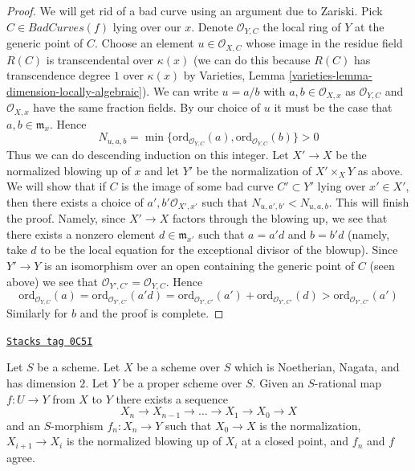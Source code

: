 \begin{proof}
\medskip\noindent
We will get rid of a bad curve using an argument due to Zariski.
Pick $C \in BadCurves(f)$ lying over our $x$. Denote $\mathcal{O}_{Y, C}$
the local ring of $Y$ at the generic point of $C$. Choose an element
$u \in \mathcal{O}_{X, C}$ whose image in the residue field
$R(C)$ is transcendental over $\kappa(x)$ (we can do this because
$R(C)$ has transcendence degree $1$ over $\kappa(x)$ by
Varieties, Lemma \ref{varieties-lemma-dimension-locally-algebraic}).
We can write $u = a/b$ with $a, b \in \mathcal{O}_{X, x}$ as
$\mathcal{O}_{Y, C}$ and $\mathcal{O}_{X, x}$ have the same
fraction fields. By our choice of $u$ it must be the case that
$a, b \in \mathfrak m_x$. Hence
$$
N_{u, a, b} = \min
\{\text{ord}_{\mathcal{O}_{Y, C}}(a), \text{ord}_{\mathcal{O}_{Y, C}}(b)\} > 0
$$
Thus we can do descending induction on this integer.
Let $X' \to X$ be the normalized blowing up of $x$
and let $Y'$ be the normalization of $X' \times_X Y$ as above. We will
show that if $C$ is the image of some bad curve $C' \subset Y'$
lying over $x' \in X'$, then
there exists a choice of $a', b' \mathcal{O}_{X', x'}$
such that $N_{u, a', b'} < N_{u, a, b}$. This will finish the proof.
Namely, since $X' \to X$ factors through the blowing up, we see that
there exists a nonzero element $d \in \mathfrak m_{x'}$ such that
$a = a' d$ and $b = b' d$ (namely, take $d$ to be the local equation
for the exceptional divisor of the blowup). Since $Y' \to Y$
is an isomorphism over an open containing the generic point of $C$
(seen above) we see that $\mathcal{O}_{Y', C'} = \mathcal{O}_{Y, C}$.
Hence
$$
\text{ord}_{\mathcal{O}_{Y, C}}(a) =
\text{ord}_{\mathcal{O}_{Y', C'}}(a' d) =
\text{ord}_{\mathcal{O}_{Y', C'}}(a') +
\text{ord}_{\mathcal{O}_{Y', C'}}(d) >
\text{ord}_{\mathcal{O}_{Y', C'}}(a')
$$
Similarly for $b$ and the proof is complete.
\end{proof}

\begin{lemma}
\label{resolve-lemma-extend-rational-map-normalized-blowing-up}
\href{https://stacks.math.columbia.edu/tag/0C5I}{\texttt{Stacks tag 0C5I}}

Let $S$ be a scheme. Let $X$ be a scheme over $S$ which is
Noetherian, Nagata, and has dimension $2$. Let $Y$ be a proper
scheme over $S$. Given an $S$-rational map $f : U \to Y$ from
$X$ to $Y$ there exists a sequence
$$
X_n \to X_{n - 1} \to \ldots \to X_1 \to X_0 \to X
$$
and an $S$-morphism $f_n : X_n \to Y$ such that $X_0 \to X$ is the
normalization, $X_{i + 1} \to X_i$ is the normalized blowing up of
$X_i$ at a closed point, and $f_n$ and $f$ agree.
\end{lemma}

